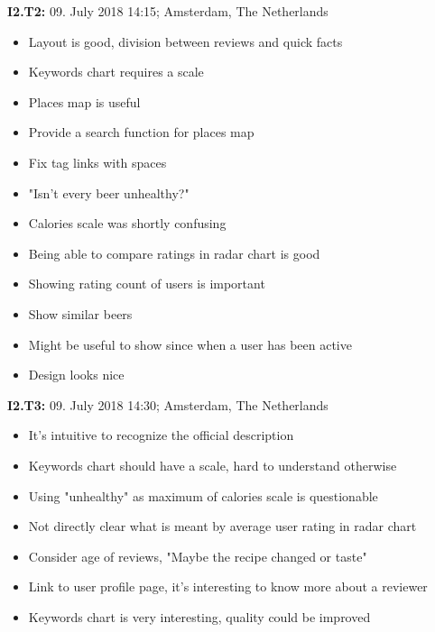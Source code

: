 \begin{flushleft}
    \textbf{I2.T2:} 09. July 2018 14:15; Amsterdam, The Netherlands
    \begin{itemize}
        \item Layout is good, division between reviews and quick facts
        \item Keywords chart requires a scale
        \item Places map is useful
        \item Provide a search function for places map
        \item Fix tag links with spaces
        \item "Isn't every beer unhealthy?"
        \item Calories scale was shortly confusing
        \item Being able to compare ratings in radar chart is good
        \item Showing rating count of users is important
        \item Show similar beers
        \item Might be useful to show since when a user has been active
        \item Design looks nice
    \end{itemize}
\end{flushleft}

\hfill

\begin{flushleft}
    \textbf{I2.T3:} 09. July 2018 14:30; Amsterdam, The Netherlands
    \begin{itemize}
        \item It's intuitive to recognize the official description
        \item Keywords chart should have a scale, hard to understand otherwise
        \item Using "unhealthy" as maximum of calories scale is questionable
        \item Not directly clear what is meant by average user rating in radar chart
        \item Consider age of reviews, "Maybe the recipe changed or taste"
        \item Link to user profile page, it's interesting to know more about a reviewer
        \item Keywords chart is very interesting, quality could be improved
    \end{itemize}
\end{flushleft}

